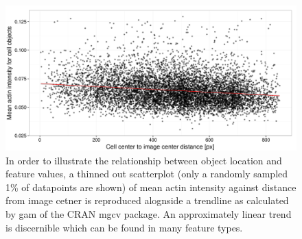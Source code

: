 \begin{knitrout}
\color{fgcolor}\begin{figure}

{\centering \includegraphics[width=.95\linewidth]{figures/R/location-trends-data-location-trend-1} 

}

\caption[Scatterplot visualization showing mean actin intensity against object distance from image center alongside a trend line.]{In order to illustrate the relationship between object location and feature values, a thinned out scatterplot (only a randomly sampled 1\% of datapoints are shown) of mean actin intensity against distance from image cetner is reproduced alognside a trendline as calculated by gam of the CRAN mgcv package. An approximately linear trend is discernible which can be found in many feature types.}\label{fig:data-location-trend}
\end{figure}


\end{knitrout}
